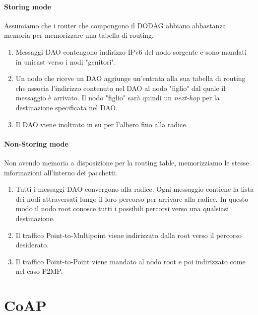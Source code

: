 \documentclass{article}
\begin{document}
\paragraph{Storing mode} Assumiamo che i router che compongono il DODAG abbiano abbastanza memoria per memorizzare una tabella di routing.
\begin{enumerate}
    \item Messaggi DAO contengono indirizzo IPv6 del nodo sorgente e sono mandati in unicast verso i nodi "genitori".
    \item Un nodo che riceve un DAO aggiunge un'entrata alla sua tabella di routing che associa l'indirizzo contenuto nel DAO al nodo "figlio" dal quale il messaggio è arrivato. Il nodo "figlio" sarà quindi un \textit{next-hop} per la destinazione specificata nel DAO.
    \item Il DAO viene inoltrato in su per l'albero fino alla radice.
\end{enumerate}
\paragraph{Non-Storing mode} Non avendo memoria a disposizione per la routing table, memorizziamo le stesse informazioni all'interno dei pacchetti.
\begin{enumerate}
    \item Tutti i messaggi DAO convergono alla radice. Ogni messaggio contiene la lista dei nodi attraversati lungo il loro percorso per arrivare alla radice. In questo modo il nodo root conosce tutti i possibili percorsi verso una qualsiasi destinazione.
    \item Il traffico Point-to-Multipoint viene indirizzato dalla root verso il percorso desiderato.
    \item Il traffico Point-to-Point viene mandato al nodo root e poi indirizzato come nel caso P2MP.
\end{enumerate}

\newpage
\section{CoAP}
\end{document}
